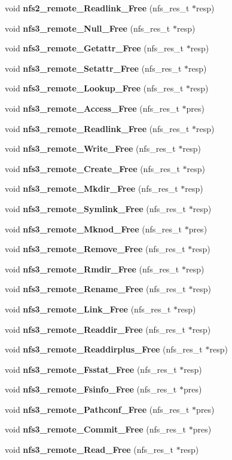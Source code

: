 \begin{DoxyCompactItemize}
\item 
void {\bf nfs2\_\-remote\_\-Readlink\_\-Free} (nfs\_\-res\_\-t $\ast$resp)
\item 
void {\bf nfs3\_\-remote\_\-Null\_\-Free} (nfs\_\-res\_\-t $\ast$resp)
\item 
void {\bf nfs3\_\-remote\_\-Getattr\_\-Free} (nfs\_\-res\_\-t $\ast$resp)
\item 
void {\bf nfs3\_\-remote\_\-Setattr\_\-Free} (nfs\_\-res\_\-t $\ast$resp)
\item 
void {\bf nfs3\_\-remote\_\-Lookup\_\-Free} (nfs\_\-res\_\-t $\ast$resp)
\item 
void {\bf nfs3\_\-remote\_\-Access\_\-Free} (nfs\_\-res\_\-t $\ast$pres)
\item 
void {\bf nfs3\_\-remote\_\-Readlink\_\-Free} (nfs\_\-res\_\-t $\ast$resp)
\item 
void {\bf nfs3\_\-remote\_\-Write\_\-Free} (nfs\_\-res\_\-t $\ast$resp)
\item 
void {\bf nfs3\_\-remote\_\-Create\_\-Free} (nfs\_\-res\_\-t $\ast$resp)
\item 
void {\bf nfs3\_\-remote\_\-Mkdir\_\-Free} (nfs\_\-res\_\-t $\ast$resp)
\item 
void {\bf nfs3\_\-remote\_\-Symlink\_\-Free} (nfs\_\-res\_\-t $\ast$resp)
\item 
void {\bf nfs3\_\-remote\_\-Mknod\_\-Free} (nfs\_\-res\_\-t $\ast$pres)
\item 
void {\bf nfs3\_\-remote\_\-Remove\_\-Free} (nfs\_\-res\_\-t $\ast$resp)
\item 
void {\bf nfs3\_\-remote\_\-Rmdir\_\-Free} (nfs\_\-res\_\-t $\ast$resp)
\item 
void {\bf nfs3\_\-remote\_\-Rename\_\-Free} (nfs\_\-res\_\-t $\ast$resp)
\item 
void {\bf nfs3\_\-remote\_\-Link\_\-Free} (nfs\_\-res\_\-t $\ast$resp)
\item 
void {\bf nfs3\_\-remote\_\-Readdir\_\-Free} (nfs\_\-res\_\-t $\ast$resp)
\item 
void {\bf nfs3\_\-remote\_\-Readdirplus\_\-Free} (nfs\_\-res\_\-t $\ast$resp)
\item 
void {\bf nfs3\_\-remote\_\-Fsstat\_\-Free} (nfs\_\-res\_\-t $\ast$resp)
\item 
void {\bf nfs3\_\-remote\_\-Fsinfo\_\-Free} (nfs\_\-res\_\-t $\ast$pres)
\item 
void {\bf nfs3\_\-remote\_\-Pathconf\_\-Free} (nfs\_\-res\_\-t $\ast$pres)
\item 
void {\bf nfs3\_\-remote\_\-Commit\_\-Free} (nfs\_\-res\_\-t $\ast$pres)
\item 
void {\bf nfs3\_\-remote\_\-Read\_\-Free} (nfs\_\-res\_\-t $\ast$resp)
\end{DoxyCompactItemize}


